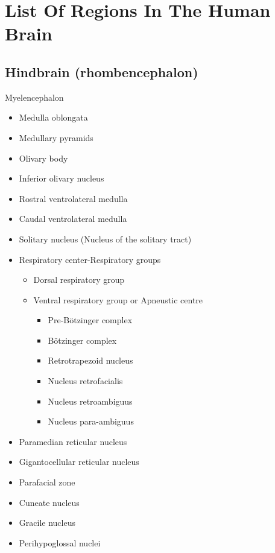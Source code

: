\hypertarget{list-of-regions-in-the-human-brain}{%
\chapter{List Of Regions In The Human Brain}\label{list-of-regions-in-the-human-brain}}

\hypertarget{hindbrain-rhombencephalon}{%
\section{Hindbrain (rhombencephalon)}\label{hindbrain-rhombencephalon}}

Myelencephalon

\begin{itemize}
\tightlist
\item
  Medulla oblongata
\item
  Medullary pyramids
\item
  Olivary body
\item
  Inferior olivary nucleus
\item
  Rostral ventrolateral medulla
\item
  Caudal ventrolateral medulla
\item
  Solitary nucleus (Nucleus of the solitary tract)
\item
  Respiratory center-Respiratory groups

  \begin{itemize}
  \tightlist
  \item
    Dorsal respiratory group
  \item
    Ventral respiratory group or Apneustic centre

    \begin{itemize}
    \tightlist
    \item
      Pre-Bötzinger complex
    \item
      Bötzinger complex
    \item
      Retrotrapezoid nucleus
    \item
      Nucleus retrofacialis
    \item
      Nucleus retroambiguus
    \item
      Nucleus para-ambiguus
    \end{itemize}
  \end{itemize}
\item
  Paramedian reticular nucleus
\item
  Gigantocellular reticular nucleus
\item
  Parafacial zone
\item
  Cuneate nucleus
\item
  Gracile nucleus
\item
  Perihypoglossal nuclei


\end{itemize}
